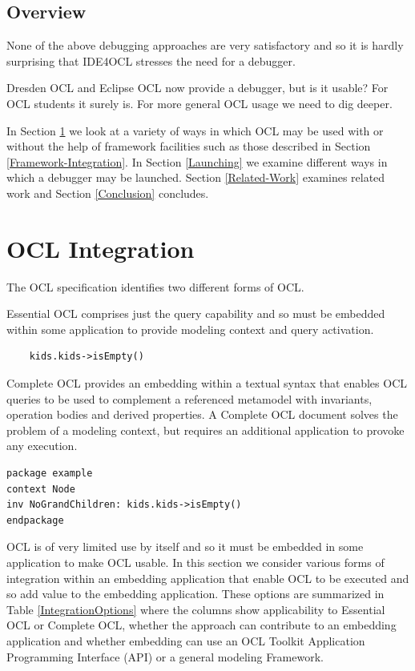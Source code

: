 \documentclass[a4paper]{article}
\begin{document}
\subsection{Overview}

None of the above debugging approaches are very satisfactory and so it is hardly surprising that IDE4OCL\cite{Chimiak-Opaka} stresses the need for a debugger.

Dresden OCL\cite{DresdenOCL-Debug} and Eclipse OCL\cite{OCL-Luna} now provide a debugger, but is it usable? For OCL students it surely is. For more general OCL usage we need to dig deeper.

In Section  \ref{OCL-Integration} we look at a variety of ways in which OCL may be used with or without the help of framework facilities such as those described in Section \ref{Framework-Integration}. In Section \ref{Launching} we examine different ways in which a debugger may be launched.  Section \ref{Related-Work} examines related work and Section \ref{Conclusion} concludes.

\section{OCL Integration}\label{OCL-Integration}

The OCL specification identifies two different forms of OCL.

Essential OCL comprises just the query capability and so must be embedded within some application to provide modeling context and query activation.

\begin{verbatim}
    kids.kids->isEmpty()
\end{verbatim}

Complete OCL provides an embedding within a textual syntax that enables OCL queries to be used to complement a referenced metamodel with invariants, operation bodies and derived properties. A Complete OCL document solves the problem of a modeling context, but requires an additional application to provoke any execution.

\begin{verbatim}
package example
context Node
inv NoGrandChildren: kids.kids->isEmpty()
endpackage
\end{verbatim}

OCL is of very limited use by itself and so it must be embedded in some application to make OCL usable. In this section we consider various forms of integration within an embedding application that enable OCL to be executed and so add value to the embedding application. These options are summarized in Table \ref{IntegrationOptions} where the columns show applicability to Essential OCL or Complete OCL, whether the approach can contribute to an embedding application and whether embedding can use an OCL Toolkit Application Programming Interface (API) or a general modeling Framework.
\end{document}
